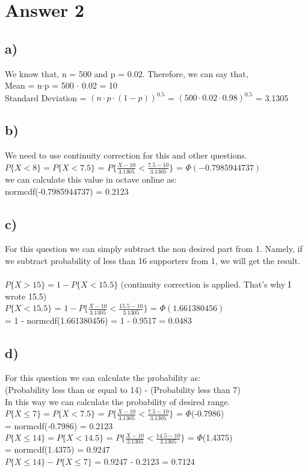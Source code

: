 \documentclass[12pt]{article}
\begin{document}
\newpage
\section*{Answer 2}

\subsection*{a)}\noindent 
We know that, n = 500 and p = 0.02. Therefore, we can say that,\\
Mean = n$\cdot$p = 500 $\cdot$ 0.02 = 10\\
Standard Deviation = $(n\cdot p\cdot(1-p))^{0.5}$ = $(500\cdot 0.02\cdot0.98)^{0.5}$ = 3.1305\\

\subsection*{b)}\noindent 
We need to use continuity correction for this and other questions.\\
$P\{X<8\} = P\{X<7.5\}$ = $P\{  \frac{X-10}{3.1305} < \frac{7.5-10}{3.1305} \}$ = $\Phi(-0.7985944737)$\\
we can calculate this value in octave online as:\\
normcdf(-0.7985944737) = 0.2123

\subsection*{c)}\noindent 
For this question we can simply subtract the non desired part from 1. Namely, if we subtract probability of less than 16 supporters from 1, we will get the result.\\\\
$P\{X>15\} = 1-P\{X<15.5\}$ (continuity correction is applied. That's why I wrote 15.5)\\
$P\{X<15.5\}$ = $1-P\{  \frac{X-10}{3.1305} < \frac{15.5-10}{3.1305} \}$ = $\Phi(1.661380456)$\\
= 1 - normcdf(1.661380456) = 1 - 0.9517 = 0.0483

\subsection*{d)}\noindent 
For this question we can calculate the probability as:\\
(Probability less than or equal to 14) - (Probability less than 7)\\
In this way we can calculate the probability of desired range.\\
$P\{X\leq7\} = P\{X<7.5\}$ = $P\{  \frac{X-10}{3.1305} < \frac{7.5-10}{3.1305} \}$ = $\Phi$(-0.7986)\\
= normcdf(-0.7986) = 0.2123\\
$P\{X\leq14\} = P\{X<14.5\}$ = $P\{  \frac{X-10}{3.1305} < \frac{14.5-10}{3.1305} \}$ = $\Phi$(1.4375)\\
= normcdf(1.4375) = 0.9247\\
$P\{X\leq14\} - P\{X\leq7\}$ = 0.9247 - 0.2123 = 0.7124\\
\end{document}
